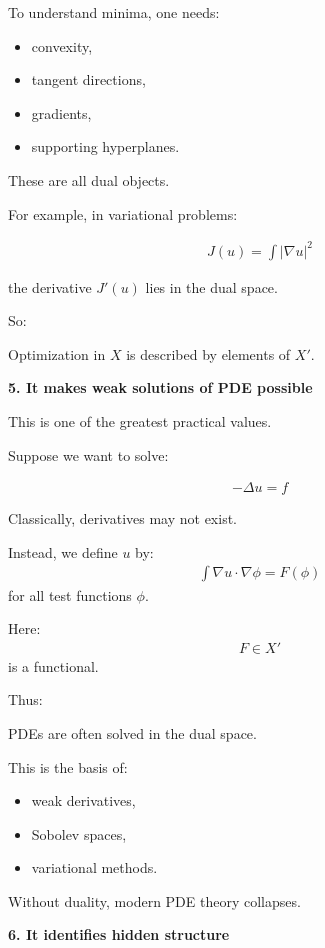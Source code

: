 \documentclass[12pt,a4paper]{report}
\begin{document}
\begin{description}
To understand minima, one needs:
	\begin{itemize}
    \item convexity,
    \item tangent directions,
    \item gradients,
    \item supporting hyperplanes.
	\end{itemize}
These are all dual objects.

For example, in variational problems:

\begin{align*}
J(u)=\int |\nabla u|^2
\end{align*}

the derivative $J'(u)$ lies in the dual space.

So:

\> Optimization in $X$ is described by elements of $X'$.

\item \textbf{5. It makes weak solutions of PDE possible}

This is one of the greatest practical values.

Suppose we want to solve:

\begin{align*}
-\Delta u=f
\end{align*}

Classically, derivatives may not exist.

Instead, we define $u$ by:
\begin{align*}
\int \nabla u\cdot \nabla \phi = F(\phi)
\end{align*}
for all test functions $\phi$.

Here:
\begin{align*}
F\in X'
\end{align*}
is a functional.

Thus:

\> PDEs are often solved in the dual space.

This is the basis of:

	\begin{itemize}
    \item weak derivatives,
    \item Sobolev spaces,
    \item variational methods.
	\end{itemize}

Without duality, modern PDE theory collapses.

\item \textbf{6. It identifies hidden structure}


\end{description}
\end{document}
